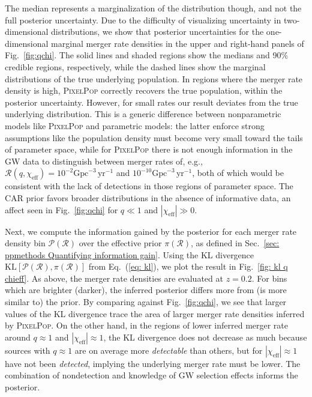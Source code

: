 \begin{refsection}
The median represents a marginalization of the distribution though, and not the full posterior uncertainty. Due to the difficulty of visualizing uncertainty in two-dimensional distributions, we show that posterior uncertainties for the one-dimensional marginal merger rate densities in the upper and right-hand panels of Fig.~\ref{fig:qchi}. The solid lines and shaded regions show the medians and 90\% credible regions, respectively, while the dashed lines show the marginal distributions of the true underlying population. In regions where the merger rate density is high, \textsc{PixelPop} correctly recovers the true population, within the posterior uncertainty. However, for small rates our result deviates from the true underlying distribution. This is a generic difference between nonparametric models like \textsc{PixelPop} and parametric models: the latter enforce strong assumptions like the population density must become very small toward the tails of parameter space, while for \textsc{PixelPop} there is not enough information in the GW data to distinguish between merger rates of, e.g., $\mathcal{R}(q,\chi_\mathrm{eff}) = 10^{-2} \mathrm{Gpc}^{-3} \, \mathrm{yr}^{-1}$ and $10^{-10} \mathrm{Gpc}^{-3} \, \mathrm{yr}^{-1}$, both of which would be consistent with the lack of detections in those regions of parameter space. The CAR prior favors broader distributions in the absence of informative data, an affect seen in Fig.~\ref{fig:qchi} for $q\ll1$ and $|\chi_\mathrm{eff}|\gg0$.

Next, we compute the information gained by the posterior for each merger rate density bin $\mathcal{P}(\mathcal{R})$ over the effective prior $\pi(\mathcal{R})$, as defined in Sec.~\ref{sec: ppmethods Quantifying information gain}. Using the KL divergence $\mathrm{KL}[\mathcal{P}(\mathcal{R}),\pi(\mathcal{R})]$ from Eq.~(\ref{eq: kl}), we plot the result in Fig.~\ref{fig: kl q chieff}. As above, the merger rate densities are evaluated at $z=0.2$. For bins which are brighter (darker), the inferred posterior differs more from (is more similar to) the prior. By comparing against Fig.~\ref{fig:qchi}, we see that larger values of the KL divergence trace the area of larger merger rate densities inferred by \textsc{PixelPop}. On the other hand, in the regions of lower inferred merger rate around $q\approx1$ and $|\chi_\mathrm{eff}|\approx1$, the KL divergence does not decrease as much because sources with $q\approx1$ are on average more \textit{detectable} than others, but for $|\chi_\mathrm{eff}|\approx1$ have not been \textit{detected}, implying the underlying merger rate must be lower. The combination of nondetection and knowledge of GW selection effects informs the posterior.


\end{refsection}
